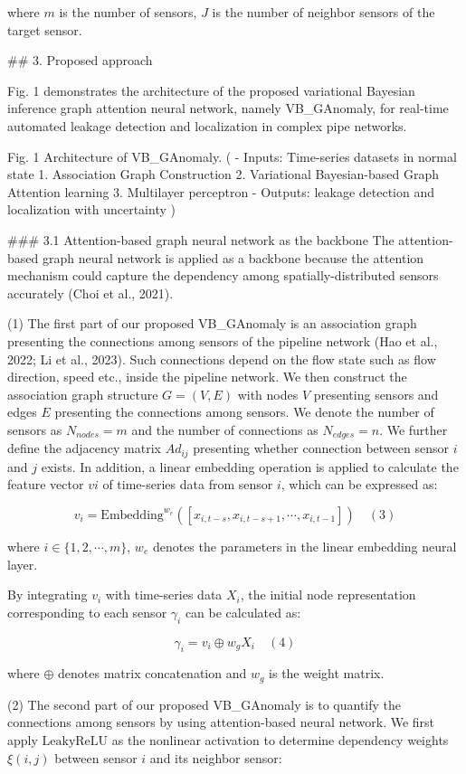 where $m$ is the number of sensors, $J$ is the number of neighbor sensors of the target sensor.

## 3. Proposed approach

Fig. 1 demonstrates the architecture of the proposed variational Bayesian inference graph attention neural network, namely VB_GAnomaly, for real-time automated leakage detection and localization in complex pipe networks.

Fig. 1 Architecture of VB_GAnomaly. (
- Inputs: Time-series datasets in normal state
    1. Association Graph Construction
    2. Variational Bayesian-based Graph Attention learning
    3. Multilayer perceptron
- Outputs: leakage detection and localization with uncertainty
)


### 3.1 Attention-based graph neural network as the backbone
The attention-based graph neural network is applied as a backbone because the attention mechanism could capture the dependency among spatially-distributed sensors accurately (Choi et al., 2021).

(1) The first part of our proposed VB_GAnomaly is an association graph presenting the connections among sensors of the pipeline network (Hao et al., 2022; Li et al., 2023). Such connections depend on the flow state such as flow direction, speed etc., inside the pipeline network. We then construct the association graph structure $G= (V, E)$ with nodes $V$ presenting sensors and edges $E$ presenting the connections among sensors. We denote the number of sensors as $N_{nodes}= m$ and the number of connections as $N_{edges}= n$. We further define the adjacency matrix $𝐴𝑑_{𝑖𝑗}$ presenting whether connection between sensor $i$ and $j$ exists. In addition, a linear embedding operation is applied to calculate the feature vector $𝑣𝑖$ of time-series data from sensor $i$, which can be expressed as:

$$
v_i = \mathrm{Embedding}^{w_e}([x_{i,t-s},x_{i,t-s+1},\cdots,x_{i,t-1}]) \quad (3)
$$

where $i \in \{1,2,\cdots,m \}$, $w_e$ denotes the parameters in the linear embedding neural layer.

By integrating $v_i$ with time-series data $X_i$, the initial node representation corresponding to each sensor $\gamma_i$ can be calculated as:

$$
\gamma_i = v_i \oplus w_g X_i \quad (4)
$$

where $\oplus$ denotes matrix concatenation and $w_g$ is the weight matrix.

(2) The second part of our proposed VB_GAnomaly is to quantify the connections among sensors by using attention-based neural network. We first apply $\mathrm{LeakyReLU}$ as the nonlinear activation to determine dependency weights $\xi(i,j)$ between sensor $i$ and its neighbor sensor:

